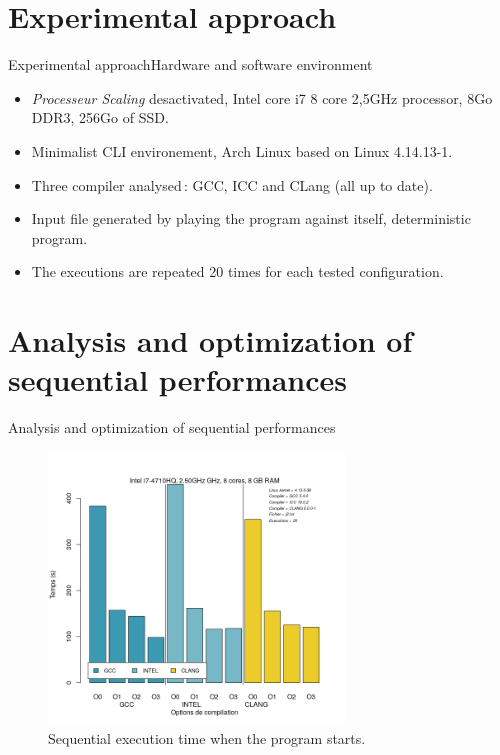 \documentclass{beamer}
\begin{document}
\section{Experimental approach}
\begin{frame}{Experimental approach}{Hardware and software environment}
\begin{itemize}
  \item
  	\textit{Processeur Scaling} desactivated, Intel core i7 8 core 2,5GHz processor, 8Go DDR3, 256Go of SSD.
  \item
    Minimalist CLI environement, Arch Linux based on Linux 4.14.13-1.
    \item
    Three compiler analysed\,: GCC, ICC and CLang (all up to date).
    \item
    Input file generated by playing the program against itself, deterministic program.
    \item
    The executions are repeated 20 times for each tested configuration.
\end{itemize}
\end{frame}

\section{Analysis and optimization of sequential performances}

\begin{frame}{Analysis and optimization of sequential performances}

\begin{figure}
      \includegraphics[width=0.7\textwidth]{GCCvsICCvsCLANG_j2.png}
      \caption{Sequential execution time when the program starts.}
\end{figure}
\end{frame}
\end{document}
